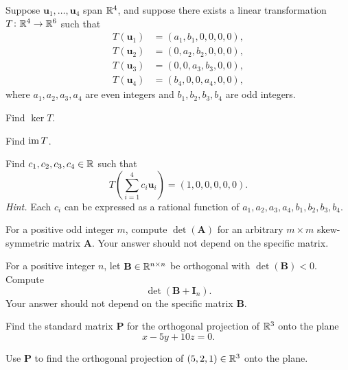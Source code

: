 \documentclass[11pt,oneside]{article}
\begin{document}
\begin{problem}
Suppose $\mathbf u_1,\dots,\mathbf u_4$ span $\mathbb{R}^4$, and suppose there exists a linear transformation $T\colon\mathbb{R}^4\to\mathbb{R}^6$ such that
\[
\begin{aligned}
T(\mathbf u_1)&=(a_1,b_1,0,0,0,0),\\
T(\mathbf u_2)&=(0,a_2,b_2,0,0,0),\\
T(\mathbf u_3)&=(0,0,a_3,b_3,0,0),\\
T(\mathbf u_4)&=(b_4,0,0,a_4,0,0),
\end{aligned}
\]
where $a_1,a_2,a_3,a_4$ are even integers and $b_1,b_2,b_3,b_4$ are odd integers.
\begin{problemsubparts}
\item Find $\ker T$.
\item Find $\operatorname{im} T$.
\item Find $c_1,c_2,c_3,c_4\in\mathbb{R}$ such that
\[
T\left(\sum_{i=1}^4 c_i\mathbf u_i\right)=(1,0,0,0,0,0).
\]
\textit{Hint.} Each $c_i$ can be expressed as a rational function of
$a_1,a_2,a_3,a_4,b_1,b_2,b_3,b_4$.
\end{problemsubparts}
\end{problem}

\begin{problem}
\begin{problemsubparts}
\item For a positive odd integer $m$, compute $\det(\mathbf A)$ for an arbitrary $m\times m$ skew-symmetric matrix $\mathbf A$. Your answer should not depend on the specific matrix.
\item For a positive integer $n$, let $\mathbf B\in\mathbb{R}^{n\times n}$ be orthogonal with $\det(\mathbf B)<0$. Compute
\[
\det(\mathbf B+\mathbf I_n).
\]
Your answer should not depend on the specific matrix $\mathbf B$.
\end{problemsubparts}
\end{problem}

\begin{problem}
\begin{problemsubparts}
\item Find the standard matrix $\mathbf P$ for the orthogonal projection of $\mathbb{R}^3$ onto the plane
\[
x-5y+10z=0.
\]
\item Use $\mathbf P$ to find the orthogonal projection of $(5,2,1)\in\mathbb{R}^3$ onto the plane.
\end{problemsubparts}
\end{problem}
\end{document}
